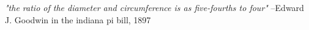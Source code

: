 \documentclass[a4paper, 12pt, openany]{book} %
\newcommand\myemptypage{
    \null
    \thispagestyle{empty}
    \addtocounter{page}{-1}
    \newpage
    } %
\begin{document}










\myemptypage %
\emph{"the ratio of the diameter and circumference is as five-fourths to four"}
--Edward J. Goodwin in the indiana pi bill, 1897
\end{document}
